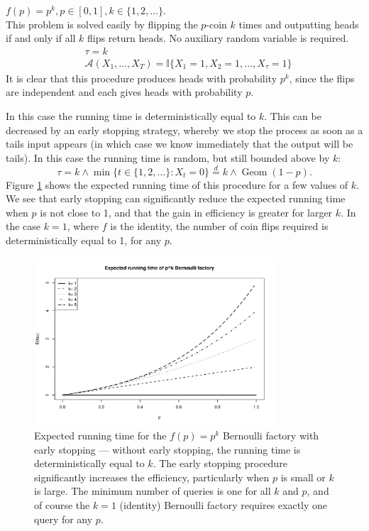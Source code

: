\documentclass{article}
\theoremstyle{definition}
\newenvironment{example}
  {\pushQED{\qed}\renewcommand{\qedsymbol}{$\triangle$}\examplex}
  {\popQED\endexamplex}
\newcommand{\eqdist}{\overset{d}{=}}
\newcommand{\Geom}{\operatorname{Geom}}
\newcommand{\A}{\mathcal{A}}
\begin{document}
\begin{example}\label{ex:bf_pk}
$f(p) = p^k, p\in[0,1], k\in\{1,2,\dots\}$.\\
This problem is solved easily by flipping the $p$-coin $k$ times and outputting heads if and only if all $k$ flips return heads. No auxiliary random variable is required.
\begin{align*}
& \tau = k \\
& \A(X_1,\dots,X_T) = \mathbb{I}\{X_1 =1, X_2=1 ,\dots,X_\tau=1\}
\end{align*}
It is clear that this procedure produces heads with probability $p^k$, since the flips are independent and each gives heads with probability $p$.

In this case the running time is deterministically equal to $k$. 
This can be decreased by an early stopping strategy, whereby we stop the process as soon as a tails input appears (in which case we know immediately that the output will be tails). In this case the running time is random, but still bounded above by $k$:
\begin{equation*}
\tau = k \wedge \min\{t \in \{1,2,\dots\}:X_t=0 \} \eqdist k \wedge \Geom(1-p).
\end{equation*}
Figure \ref{fig:p2_runtime} shows the expected running time of this procedure for a few values of $k$. We see that early stopping can significantly reduce the expected running time when $p$ is not close to 1, and that the gain in efficiency is greater for larger $k$. In the case $k=1$, where $f$ is the identity, the number of coin flips required is deterministically equal to 1, for any $p$.
\begin{figure}
\centering
\includegraphics[width=0.8\textwidth]{pk_runtime.pdf}
\caption{Expected running time for the $f(p)=p^k$ Bernoulli factory with early stopping --- without early stopping, the running time is deterministically equal to $k$. The early stopping procedure significantly increases the efficiency, particularly when $p$ is small or $k$ is large. The minimum number of queries is one for all $k$ and $p$, and of course the $k=1$ (identity) Bernoulli factory requires exactly one query for any $p$.}\label{fig:p2_runtime}
\end{figure}
\end{example}
\end{document}
